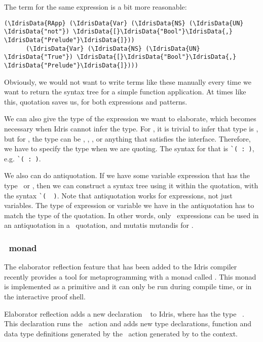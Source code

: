 The  term for the same expression is a bit more reasonable:
\begin{Verbatim}[framesep=2mm, label=\footnotesize{\normalfont{Idris}}, labelposition=topline]
(\IdrisData{RApp} (\IdrisData{Var} (\IdrisData{NS} (\IdrisData{UN} \IdrisData{"not"}) \IdrisData{[}\IdrisData{"Bool"}\IdrisData{,} \IdrisData{"Prelude"}\IdrisData{]}))
      (\IdrisData{Var} (\IdrisData{NS} (\IdrisData{UN} \IdrisData{"True"}) \IdrisData{[}\IdrisData{"Bool"}\IdrisData{,} \IdrisData{"Prelude"}\IdrisData{]})))
\end{Verbatim}

Obviously, we would not want to write terms like these manually every time we want to return
the syntax tree for a simple function application.
At times like this, quotation saves us, for both expressions and patterns.

We can also give the type of the expression we want to elaborate, which becomes
necessary when Idris cannot infer the type. For , it is trivial to
infer that type is , but for , the type can be ,
, , or anything that satisfies the  interface.
Therefore, we have to specify the type when we are quoting. The
syntax for that is \texttt{\`{}( : )},
e.g. \texttt{\`{}( : )}.

We also can do antiquotation. If we have some variable expression  that has the
type \TT\ or , then we can construct a syntax tree using it within the
quotation, with the syntax \texttt{\`{}( ~)}.
Note that antiquotation works for expressions, not just variables. The type of
expression or variable we have in the antiquotation has to match the type of
the quotation. In other words, only \TT\ expressions can be used in an
antiquotation in a \TT\ quotation, and mutatis mutandis for .

\subsubsection{\protect\Elab\ monad}

The elaborator reflection\cite{elabref} feature that has been added to the
Idris compiler recently provides a tool for metaprogramming with a monad called
\Elab.  This monad is implemented as a primitive and it can only be run during
compile time, or in the interactive proof shell.

Elaborator reflection adds a new declaration
\texttt{}\  to Idris,
where  has the type \ \ty{()}.
This declaration runs the \Elab\ action and adds new type declarations,
function and data type definitions generated by the \Elab\ action generated by
 to the context.

